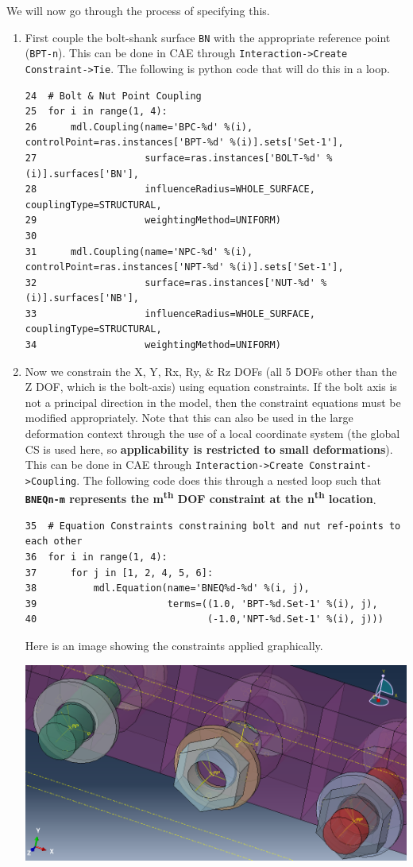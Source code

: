 \documentclass[11pt]{article}
\begin{document}
We will now go through the process of specifying this.
\begin{enumerate}
\item First couple the bolt-shank surface \texttt{BN} with the appropriate reference point (\texttt{BPT-n}).
This can be done in CAE through \texttt{Interaction->Create Constraint->Tie}.
The following is python code that will do this in a loop.
\begin{verbatim}
24  # Bolt & Nut Point Coupling
25  for i in range(1, 4):
26      mdl.Coupling(name='BPC-%d' %(i), controlPoint=ras.instances['BPT-%d' %(i)].sets['Set-1'],
27                   surface=ras.instances['BOLT-%d' %(i)].surfaces['BN'],
28                   influenceRadius=WHOLE_SURFACE, couplingType=STRUCTURAL,
29                   weightingMethod=UNIFORM)
30  
31      mdl.Coupling(name='NPC-%d' %(i), controlPoint=ras.instances['NPT-%d' %(i)].sets['Set-1'],
32                   surface=ras.instances['NUT-%d' %(i)].surfaces['NB'],
33                   influenceRadius=WHOLE_SURFACE, couplingType=STRUCTURAL,
34                   weightingMethod=UNIFORM)
\end{verbatim}
\item Now we constrain the X, Y, Rx, Ry, \& Rz DOFs (all 5 DOFs other than the Z DOF, which is the bolt-axis) using equation constraints.
If the bolt axis is not a principal direction in the model, then the constraint equations must be modified appropriately.
Note that this can also be used in the large deformation context through the use of a local coordinate system (the global CS is used here, so \textbf{applicability is restricted to small deformations}).
This can be done in CAE through \texttt{Interaction->Create Constraint->Coupling}.
The following code does this through a nested loop such that \textbf{\texttt{BNEQn-m}  represents the m\textsuperscript{th} DOF constraint at the n\textsuperscript{th} location}.
\begin{verbatim}
35  # Equation Constraints constraining bolt and nut ref-points to each other
36  for i in range(1, 4):
37      for j in [1, 2, 4, 5, 6]:
38          mdl.Equation(name='BNEQ%d-%d' %(i, j),
39                       terms=((1.0, 'BPT-%d.Set-1' %(i), j),
40                              (-1.0,'NPT-%d.Set-1' %(i), j)))
\end{verbatim}
Here is an image showing the constraints applied graphically.
\begin{center}
\includegraphics[width=.9\linewidth]{./figs/conss.png}

\end{center}
\end{enumerate}
\end{document}
